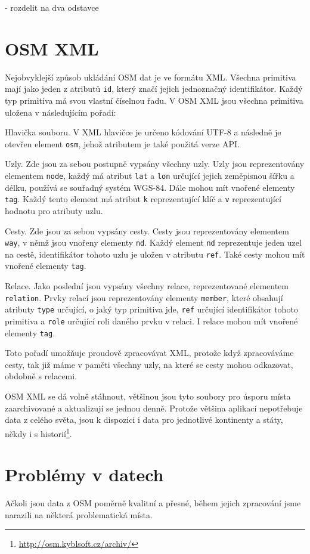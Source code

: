 - rozdelit na dva odstavce

\section{OSM XML}
Nejobvyklejší způsob ukládání OSM dat je ve formátu XML. Všechna primitiva mají
jako jeden z atributů \verb|id|, který značí jejich jednoznačný identifikátor.
Každý typ primitiva má svou vlastní číselnou řadu. V OSM XML\cite{osmxml} jsou
všechna primitiva uložena v následujícím pořadí:


{\tuc Hlavička souboru.} V XML hlavičce je určeno kódování UTF-8 a následně je
otevřen element \verb|osm|, jehož atributem je také použitá verze API. 

{\tuc Uzly.} Zde jsou za sebou postupně vypsány všechny uzly. Uzly jsou
reprezentovány elementem \verb|node|, každý má atribut \verb|lat| a \verb|lon|
určující jejich zeměpisnou šířku a délku, používá se souřadný systém
WGS-84\cite{wgsnorma}. Dále mohou
mít vnořené elementy \verb|tag|. Každý tento element má atribut \verb|k|
reprezentující klíč a \verb|v| reprezentující hodnotu pro atributy uzlu.

{\tuc Cesty.} Zde jsou za sebou vypsány cesty. Cesty jsou reprezentovány
elementem \verb|way|, v němž jsou vnořeny elementy \verb|nd|. Každý element
\verb|nd| reprezentuje jeden uzel na cestě, identifikátor tohoto uzlu je uložen
v atributu \verb|ref|. Také cesty mohou mít vnořené elementy \verb|tag|.

{\tuc Relace.} Jako poslední jsou vypsány všechny relace, reprezentované
elementem \verb|relation|. Prvky relací jsou reprezentovány elementy
\verb|member|, které obsahují atributy \verb|type| určující, o jaký typ
primitiva jde, \verb|ref| určující identifikátor tohoto primitiva a \verb|role|
určující roli daného prvku v relaci. I relace mohou mít vnořené elementy
\verb|tag|.


Toto pořadí umožňuje proudově zpracovávat XML, protože když zpracováváme cesty,
tak již máme v paměti všechny uzly, na které se cesty mohou odkazovat, obdobně
s relacemi. 

OSM XML se dá volně stáhnout, většinou jsou tyto soubory pro úsporu místa
zaarchivované a aktualizují se jednou denně. Protože většina aplikací
nepotřebuje data z celého světa, jsou k dispozici i data pro jednotlivé
kontinenty a státy, někdy i s
historií\footnote{\url{http://osm.kyblsoft.cz/archiv/}}. 

\section{Problémy v datech}
Ačkoli jsou data z OSM poměrně kvalitní a přesné, během jejich zpracování jsme
narazili na některá problematická místa. 

